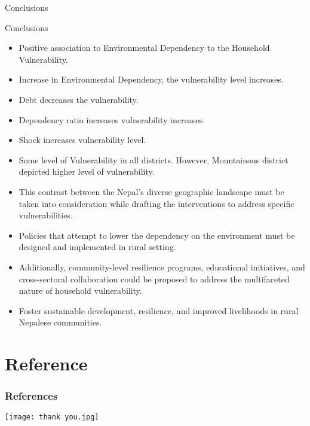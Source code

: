 \documentclass{beamer}
\begin{document}
	\begin{frame}{Conclusions}
		\begin{exampleblock}{Conclusions}  
			
			\begin{itemize} \scriptsize
				\item Positive association to Environmental Dependency to the Household Vulnerability.
				\item Increase in Environmental  Dependency, the vulnerability level increases.
				\item Debt decreases the vulnerability.
				\item Dependency ratio increases vulnerability increases.
				\item Shock increases vulnerability level.
				\item Some level of Vulnerability in all districts. However, Mountainous district depicted higher level of vulnerability.
				\item This contrast between the Nepal’s diverse geographic landscape must be taken into consideration while drafting the interventions to address specific vulnerabilities.
				\item  Policies that attempt to lower the dependency on the environment must be designed and implemented in rural setting.
				\item Additionally, community-level resilience programs, educational initiatives, and cross-sectoral collaboration could be proposed to address the multifaceted nature of household vulnerability.
				\item Foster sustainable development, resilience, and improved livelihoods in rural Nepalese communities.      
			\end{itemize}
		\end{exampleblock}
	\end{frame}
	
	\section{Reference}
	\begin{frame}[allowframebreaks]
		\frametitle{References}
		\tiny{}
		\scriptsize 
		
	\end{frame}
	
	\begin{frame}
		\texttt{[image: thank you.jpg]}
	\end{frame}
	
\end{document}

